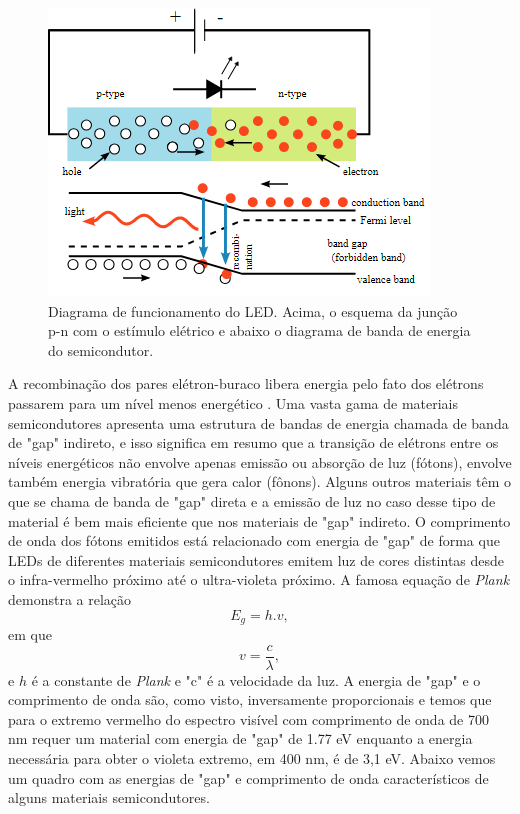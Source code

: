 \begin{figure}[ht]
    \begin{center}
    \includegraphics{figuras/led.PNG}
    \end{center}
    \caption[Diagrama de funcionamento do LED.]{Diagrama de funcionamento do LED. Acima, o esquema da junção p-n com o estímulo elétrico e abaixo o diagrama de banda de energia do semicondutor.}
    \label{led}
\end{figure}


A recombinação dos pares elétron-buraco libera energia pelo fato dos elétrons passarem para um nível menos energético \cite{rezende}. Uma vasta gama de materiais semicondutores apresenta uma estrutura de bandas de energia chamada de banda de "gap" indireto, e isso significa em resumo que a transição de elétrons entre os níveis energéticos não envolve apenas emissão ou absorção de luz (fótons), envolve também energia vibratória que gera calor (fônons). Alguns outros materiais têm o que se chama de banda de "gap" direta e a emissão de luz no caso desse tipo de material é bem mais eficiente que nos materiais de "gap" indireto. O comprimento de onda dos fótons emitidos está relacionado com energia de "gap" de forma que LEDs de diferentes materiais semicondutores emitem luz de cores distintas desde o infra-vermelho próximo até o ultra-violeta próximo. A famosa equação de \textit{Plank} demonstra a relação
\begin{equation}
    \label{eq:led_2}
    E_g = h.v,
\end{equation}
em que
\begin{equation}
    \label{eq:led_1}
    v = \frac{c}{\lambda},
\end{equation}
e $h$ é a constante de \textit{Plank} e "c" é a velocidade da luz. A energia de "gap" e o comprimento de onda são, como visto, inversamente proporcionais e temos que para o extremo vermelho do espectro visível com comprimento de onda de 700 nm requer um material com energia de "gap" de 1.77 eV enquanto a energia necessária para obter o violeta extremo, em 400 nm, é de 3,1 eV. Abaixo vemos um quadro com as energias de "gap" e comprimento de onda característicos de alguns materiais semicondutores.

